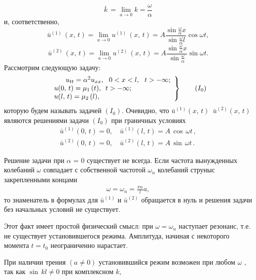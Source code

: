 \documentclass[a4paper, 12pt]{article}
\begin{document}
\begin{equation} \label{f70} \bar{k}\,= \lim\limits_{a \to 0} k =\frac{\omega}{\alpha}
\end{equation}
и, соответственно,\begin{equation} \label{f70} \bar{u}^{(1)}\,(x,\,t)= \lim\limits_{a \to 0} u^{(1)}\,(x,\,t) =A\frac{\sin\frac{\omega}{\alpha}x} {\sin\frac{\omega}{\alpha}l}\cos\omega t,
\end{equation}\begin{equation} \label{f70} \bar{u}^{(2)}\,(x,\,t)= \lim\limits_{a \to 0} u^{(2)}\,(x,\,t) =A\frac{\sin\frac{\omega}{\alpha}x} {\sin\frac{\omega}{\alpha}}\sin\omega t.
\end{equation}
Рассмотрим следующую задачу:\begin{equation*}
\left.
\begin{array}{ll}
   \,\,\,\,\,\,\,\,\,\,u_{tt} =\alpha^2u_{xx},\,\,\,\,0<x<l,\,\,\,\,  t>-\infty; \\
   u(0,\,t)=\mu_{1}\,(t),\,\,\,t>-\infty; \\
   u(l,\,t)=\mu_{2}\,(l),
 \end{array}\right\}\tag{\(I_{0}\)}
\end{equation*}
которую будем называть задачей \((I_{0})\). Очевидно, что \(\bar{u}^{(1)} (x,\,t)\)\,   \(\bar{u}^{(2)} (x,\,t)\)\, являются решениями задачи \((I_{0})\) при граничных условиях\begin{gather*}
    \bar{u}^{(1)}(0,\,t)=0,\quad \bar{u}^{(1)}(l,\,t)=A\,\cos\, \omega t\,, \\
    \bar{u}^{(2)}(0,\,t)=0,\quad \bar{u}^{(2)}(l,\,t)=A\,\sin\, \omega t\,.
\end{gather*}



Решение задачи при \(\alpha\) = 0 существует не всегда. Если частота вынужденных колебаний \(\omega\) совпадает с собственной частотой \(\omega_{n}\) колебаний струныс закрепленными концами\begin{gather*}
    \omega=\omega_{n}=\frac{\pi n}{l}a,
\end{gather*}
то знаменатель в формулах для \(\bar{u}^{(1)}\) и \(\bar{u}^{(2)}\)  обращается в нуль и решения задачи без начальных условий не существует.

Этот факт имеет простой физический смысл: при \( \omega=\omega_{n}\) наступает резонанс, т.е. не существует установившегося режима. Амплитуда, начиная с некоторого момента \( t=t_{0}\) неограниченно нарастает.

При наличии трения \( (a\neq0)\) установившийся режим возможен при любом \(\omega\) , так как \(\sin\,kl\neq0\) при комплексном \( k\),
\end{document}
